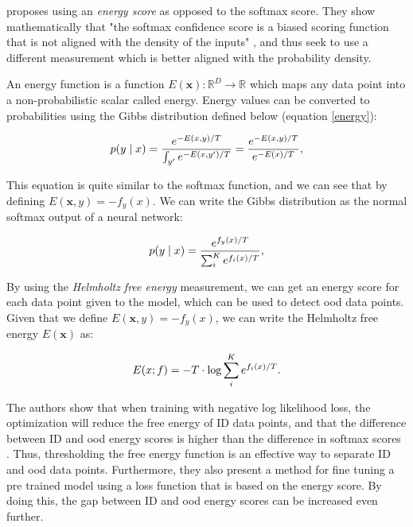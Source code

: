 \documentclass[UKenglish]{uiomasterthesis} %
\theoremstyle{definition}
\begin{document}
\cite{energy} proposes using an {\it energy score} as opposed to the softmax score. They show mathematically that "the softmax confidence score is a biased scoring function that is not aligned with the density of the inputs" \cite{energy}, and thus seek to use a different measurement which is better aligned with the probability density.

An energy function is a function $E(\bm{x}) : \mathbb{R}^D \rightarrow \mathbb{R}$ which maps any data point into a non-probabilistic scalar called energy. Energy values can be converted to probabilities using the Gibbs distribution defined below (equation \ref{energy}):

\begin{equation} \label{energy}
    p(y \mid \*x) = \frac{e^{-E(\*x,y)/T}}{\int_{y'} e^{-E(\*x, y')/T}}
    = \frac{e^{-E(\*x,y)/T}}{e^{-E(\*x)/T}},
\end{equation}

This equation is quite similar to the softmax function, and we can see that by defining $E(\bm{x}, y) = -f_y(x)$. We can write the Gibbs distribution as the normal softmax output of a neural network:

\begin{equation}\label{eq:softmax}
    p(y \mid \*x) = \frac{e^{f_y(\*x)/T}}{\sum_{i}^K e^{f_{i}(\*x)/T}},
\end{equation}

By using the {\it Helmholtz free energy} measurement, we can get an energy score for each data point given to the model, which can be used to detect \ac{ood} data points. Given that we define $E(\bm{x}, y) = -f_y(x)$, we can write the Helmholtz free energy $E(\bm{x})$ as:

\begin{equation}\label{eq:energy_softmax}
  E(\*x;f)=- T\cdot \text{log}\sum_i^K e^{f_i(\*x)/T}.
\end{equation}

The authors show that when training with negative log likelihood loss, the optimization will reduce the free energy of ID data points, and that the difference  between ID and \ac{ood} energy scores is higher than the difference in softmax scores \cite{energy}. Thus, thresholding the free energy function is an effective way to separate ID and \ac{ood} data points. Furthermore, they also present a method for fine tuning a pre trained model using a loss function that is based on the energy score. By doing this, the gap between ID and \ac{ood} energy scores can be increased even further.
\\
\end{document}
